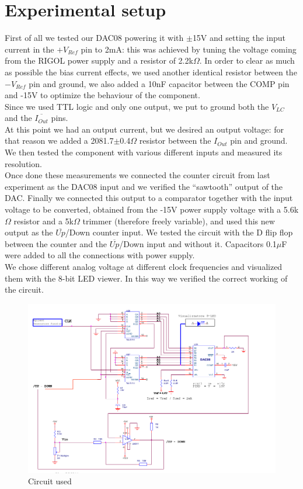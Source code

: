 \section{Experimental setup}
First of all we tested our DAC08 powering it with \(\pm\)15V and setting the input current in the $+V_{Ref}$ pin to 2mA: this was achieved by tuning the voltage coming from the RIGOL power supply and a resistor of 2.2k\(\Omega\). In order to clear as much as possible the bias current effects, we used another identical resistor between the $-V_{Ref}$ pin and ground, we also added a 10nF capacitor between the COMP pin and -15V to optimize the behaviour of the component.\\
Since we used TTL logic and only one output, we put to ground both the $V_{LC}$ and the $\overline{I_{Out}}$ pins.\\
At this point we had an output current, but we desired an output voltage: for that reason we added a 2081.7\(\pm\)0.4\(\Omega\) resistor between the $I_{Out}$ pin and ground. We then tested the component with various different inputs and measured its resolution. 
\\Once done these measurements we connected the counter circuit from last experiment as the DAC08 input and we verified the ``sawtooth'' output of the DAC. Finally we connected this output to a comparator together with the input voltage to be converted, obtained from the -15V power supply voltage with a 5.6k\(\Omega\) resistor and a 5k\(\Omega\) trimmer (therefore freely variable), and used this new output as the $\overline{Up}$/Down counter input. We tested the circuit with the D flip flop between the counter and the $\overline{Up}$/Down input and without it. Capacitors 0.1\(\mu\)F were added to all the connections with power supply.\\
We chose different analog voltage at different clock frequencies and visualized them with the 8-bit LED viewer. In this way we verified the correct working of the circuit.

\begin{figure}[H]
\centering
\includegraphics[width=.8\textwidth]{12/circuit.png}
\caption{Circuit used}
\end{figure}

